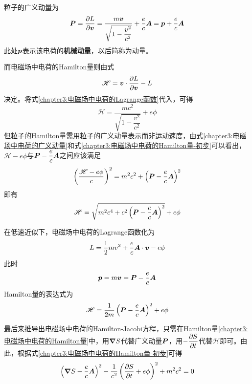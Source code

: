 粒子的广义动量为
\begin{equation}
	\boldsymbol{P} = \frac{\partial L}{\partial \boldsymbol{v}} = \frac{m\boldsymbol{v}}{\sqrt{1-\dfrac{v^2}{c^2}}} + \frac{e}{c}\boldsymbol{A} = \boldsymbol{p}+\frac{e}{c}\boldsymbol{A}
	\label{chapter3:电磁场中电荷的广义动量}
\end{equation}
此处$\boldsymbol{p}$表示该电荷的{\bf 机械动量}，以后简称为动量。

而电磁场中电荷的Hamilton量则由式
\begin{equation*}
	\mathscr{H} = \boldsymbol{v}\cdot \frac{\partial L}{\partial \boldsymbol{v}} - L
\end{equation*}
决定。将式\eqref{chapter3:电磁场中电荷的Lagrange函数}代入，可得
\begin{equation}
	\mathscr{H} = \frac{mc^2}{\sqrt{1-\dfrac{v^2}{c^2}}}+e\phi
	\label{chapter3:电磁场中电荷的Hamilton量-用速度表示的Hamilton量}
\end{equation}
但粒子的Hamilton量需用粒子的广义动量表示而非运动速度，由式\eqref{chapter3:电磁场中电荷的广义动量}和式\eqref{chapter3:电磁场中电荷的Hamilton量-初步}可以看出，$\mathscr{H}-e\phi$与$\boldsymbol{P}-\dfrac{e}{c}\boldsymbol{A}$之间应该满足
\begin{equation}
	\left(\frac{\mathscr{H}-e\phi}{c}\right)^2 = m^2c^2+\left(\boldsymbol{P}-\dfrac{e}{c}\boldsymbol{A}\right)^2
	\label{chapter3:电磁场中电荷的Hamilton量-初步}
\end{equation}
即有
\begin{equation}
	\mathscr{H} = \sqrt{m^2c^4+c^2\left(\boldsymbol{P}-\dfrac{e}{c}\boldsymbol{A}\right)^2}+e\phi
	\label{chapter3:电磁场中电荷的Hamilton量}
\end{equation}

在低速近似下，电磁场中电荷的Lagrange函数化为
\begin{equation}
	L = \frac12mv^2+\dfrac{e}{c}\boldsymbol{A}\cdot \boldsymbol{v}-e\phi
	\label{chapter3:低速近似下，电磁场中电荷的Lagrange函数}
\end{equation}
此时
\begin{equation*}
	\boldsymbol{p} = m\boldsymbol{v} = \boldsymbol{P}-\dfrac{e}{c}\boldsymbol{A}
\end{equation*}
Hamilton量的表达式为
\begin{equation}
	\mathscr{H} = \frac{1}{2m}\left(\boldsymbol{P}-\dfrac{e}{c}\boldsymbol{A}\right)^2 + e\phi
	\label{chapter3:低速近似下，电磁场中电荷的Hamilton量}
\end{equation}

最后来推导出电磁场中电荷的Hamilton-Jacobi方程，只需在Hamilton量\eqref{chapter3:电磁场中电荷的Hamilton量}中，用$\boldsymbol{\nabla} S$代替广义动量$\boldsymbol{P}$，用$-\dfrac{\partial S}{\partial t}$代替$\mathscr{H}$即可。由此，根据式\eqref{chapter3:电磁场中电荷的Hamilton量-初步}可得
\begin{equation}
	\left(\boldsymbol{\nabla} S-\dfrac{e}{c}\boldsymbol{A}\right)^2-\frac{1}{c^2}\left(\frac{\partial S}{\partial t} + e\phi\right)^2 + m^2c^2 = 0
	\label{chapter3:电磁场中电荷的Hamilton-Jacobi方程}
\end{equation}

